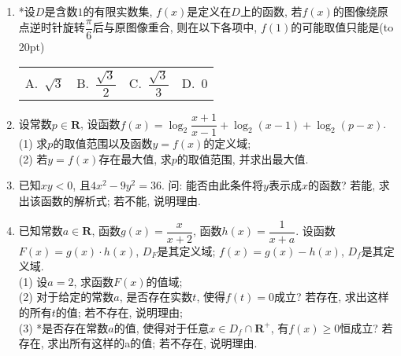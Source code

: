 \documentclass[10pt,a4paper]{article}
\newcommand{\bracket}[1]{(\hbox to #1pt{})}
\newcommand{\fourch}[4]{\par\begin{tabular}{p{.23\textwidth}p{.23\textwidth}p{.23\textwidth}p{.23\textwidth}}
A.~#1 &B.~#2& C.~#3& D.~#4
\end{tabular}}
\begin{document}
\begin{enumerate}[1.]
\item *设$D$是含数$1$的有限实数集, $f(x)$是定义在$D$上的函数, 若$f(x)$的图像绕原点逆时针旋转$\dfrac \pi6$后与原图像重合, 则在以下各项中, $f(1)$的可能取值只能是\bracket{20}
\fourch{$\sqrt3$}{$\dfrac{\sqrt{3}}2$}{$\dfrac{\sqrt{3}}3$}{$0$}
\item 设常数$p\in \mathbf{R}$, 设函数$f(x)=\log_2\dfrac{x+1}{x-1}+\log_2(x-1)+\log_2(p-x)$.\\
(1) 求$p$的取值范围以及函数$y=f(x)$的定义域;\\
(2) 若$y=f(x)$存在最大值, 求$p$的取值范围, 并求出最大值.
\item 已知$xy<0$, 且$4x^2-9y^2=36$. 问: 能否由此条件将$y$表示成$x$的函数? 若能, 求出该函数的解析式; 若不能, 说明理由.
\item 已知常数$a\in \mathbf{R}$, 函数$g(x)=\dfrac x{x+2}$, 函数$h(x)=\dfrac 1{x+a}$. 设函数$F(x)=g(x)\cdot h(x)$, $D_F$是其定义域; $f(x)=g(x)-h(x)$, $D_f$是其定义域.\\
(1) 设$a=2$, 求函数$F(x)$的值域;\\
(2) 对于给定的常数$a$, 是否存在实数$t$, 使得$f(t)=0$成立? 若存在, 求出这样的所有$t$的值; 若不存在, 说明理由;\\
(3) *是否存在常数$a$的值, 使得对于任意$x\in {D_f}\cap \mathbf{R}^+$, 有$f(x)\ge 0$恒成立? 若存在, 求出所有这样的a的值; 若不存在, 说明理由.


\end{enumerate}
\end{document}
